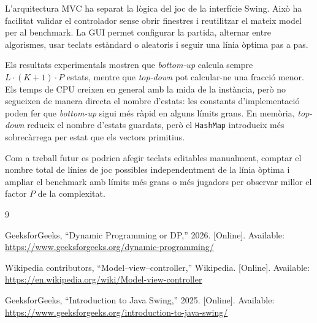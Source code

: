 \documentclass[conference,compsoc]{IEEEtran}
\begin{document}
L'arquitectura MVC ha separat la lògica del joc de la interfície Swing. Això ha
facilitat validar el controlador sense obrir finestres i reutilitzar el mateix
model per al benchmark. La GUI permet configurar la partida, alternar entre
algorismes, usar teclats estàndard o aleatoris i seguir una línia òptima pas a pas.

Els resultats experimentals mostren que \textit{bottom-up} calcula sempre
$L\cdot(K+1)\cdot P$ estats, mentre que \textit{top-down} pot calcular-ne una
fracció menor. Els temps de CPU creixen en general amb la mida de la instància,
però no segueixen de manera directa el nombre d'estats: les constants
d'implementació poden fer que \textit{bottom-up} sigui més ràpid en alguns
límits grans. En memòria, \textit{top-down} redueix el nombre d'estats guardats,
però el \texttt{HashMap} introdueix més sobrecàrrega per estat que els vectors
primitius.

Com a treball futur es podrien afegir teclats editables manualment, comptar el
nombre total de línies de joc possibles independentment de la línia òptima i
ampliar el benchmark amb límits més grans o més jugadors per observar millor el
factor $P$ de la complexitat.

\begin{thebibliography}{9}

GeeksforGeeks, ``Dynamic Programming or DP,'' 2026. [Online]. Available:
\url{https://www.geeksforgeeks.org/dynamic-programming/}

Wikipedia contributors, ``Model--view--controller,'' Wikipedia. [Online].
Available: \url{https://en.wikipedia.org/wiki/Model-view-controller}

GeeksforGeeks, ``Introduction to Java Swing,'' 2025. [Online]. Available:
\url{https://www.geeksforgeeks.org/introduction-to-java-swing/}

\end{thebibliography}
\end{document}

